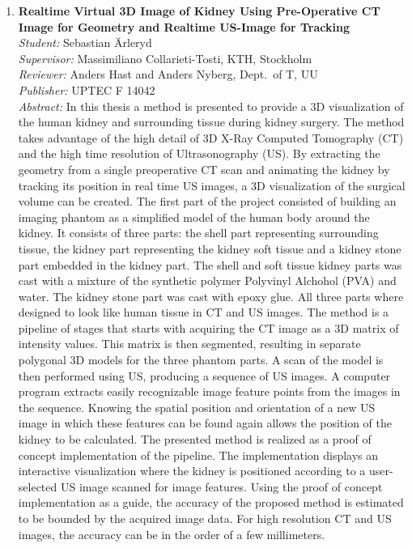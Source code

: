 \begin{small}
\begin{enumerate}
\item\textbf{Realtime Virtual 3D Image of Kidney Using Pre-Operative CT Image for Geometry and Realtime US-Image for Tracking}\\
  \emph{Student:} Sebastian Ärleryd\\
  \emph{Supervisor:} Massimiliano Collarieti-Tosti, KTH, Stockholm\\ 
  \emph{Reviewer:} Anders Hast and Anders Nyberg, Dept.~of T, UU\\
  \emph{Publisher:} UPTEC F 14042\\
  \emph{Abstract:} In this thesis a method is presented to provide a 3D visualization of the human kidney and surrounding tissue during kidney surgery. The method takes advantage of the high detail of 3D X-Ray Computed Tomography (CT) and the high time resolution of Ultrasonography (US). By extracting the geometry from a single preoperative CT scan and animating the kidney by tracking its position in real time US images, a 3D visualization of the surgical volume can be created. The first part of the project consisted of building an imaging phantom as a simplified model of the human body around the kidney. It consists of three parts: the shell part representing surrounding tissue, the kidney part representing the kidney soft tissue and a kidney stone part embedded in the kidney part. The shell and soft tissue kidney parts was cast with a mixture of the synthetic polymer Polyvinyl Alchohol (PVA) and water. The kidney stone part was cast with epoxy glue. All three parts where designed to look like human tissue in CT and US images. The method is a pipeline of stages that starts with acquiring the CT image as a 3D matrix of intensity values. This matrix is then segmented, resulting in separate polygonal 3D models for the three phantom parts. A scan of the model is then performed using US, producing a sequence of US images. A computer program extracts easily recognizable image feature points from the images in the sequence. Knowing the spatial position and orientation of a new US image in which these features can be found again allows the position of the kidney to be calculated. The presented method is realized as a proof of concept implementation of the pipeline. The implementation displays an interactive visualization where the kidney is positioned according to a user-selected US image scanned for image features. Using the proof of concept implementation as a guide, the accuracy of the proposed method is estimated to be bounded by the acquired image data. For high resolution CT and US images, the accuracy can be in the order of a few millimeters. 


\end{enumerate}
\end{small}
